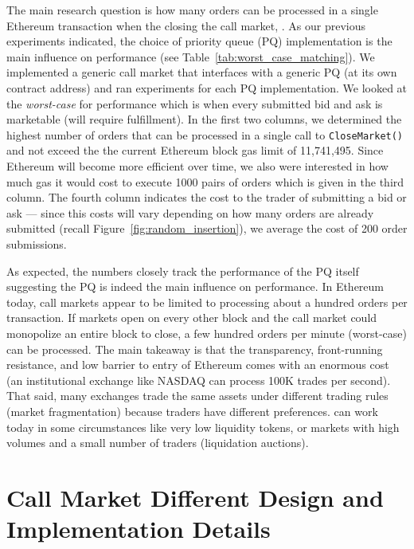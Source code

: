 The main research question is how many orders can be processed in a single Ethereum transaction when the closing the call market, . As our previous experiments indicated, the choice of priority queue (PQ) implementation is the main influence on performance (see Table~\ref{tab:worst_case_matching}). We implemented a generic call market that interfaces with a generic PQ (at its own contract address) and ran experiments for each PQ implementation. We looked at the \textit{worst-case} for performance which is when every submitted bid and ask is marketable (\ie will require fulfillment). In the first two columns, we determined the highest number of orders that can be processed in a single call to \texttt{CloseMarket()} and not exceed the the current Ethereum block gas limit of 11,741,495. Since Ethereum will become more efficient over time, we also were interested in how much gas it would cost to execute 1000 pairs of orders which is given in the third column. The fourth column indicates the cost to the trader of submitting a bid or ask --- since this costs will vary depending on how many orders are already submitted (recall Figure~\ref{fig:random_insertion}), we average the cost of 200 order submissions. 

As expected, the numbers closely track the performance of the PQ itself suggesting the PQ is indeed the main influence on performance. In Ethereum today, call markets appear to be limited to processing about a hundred orders per transaction. If markets open on every other block and the call market could monopolize an entire block to close, a few hundred orders per minute (worst-case) can be processed. The main takeaway is that the transparency, front-running resistance, and low barrier to entry of Ethereum comes with an enormous cost (\ie an institutional exchange like NASDAQ can process 100K trades per second). That said, many exchanges trade the same assets under different trading rules (\ie market fragmentation) because traders have different preferences. \cm can work today in some circumstances like very low liquidity tokens, or markets with high volumes and a small number of traders (\eg liquidation auctions). 





\section{Call Market Different Design and Implementation Details }

